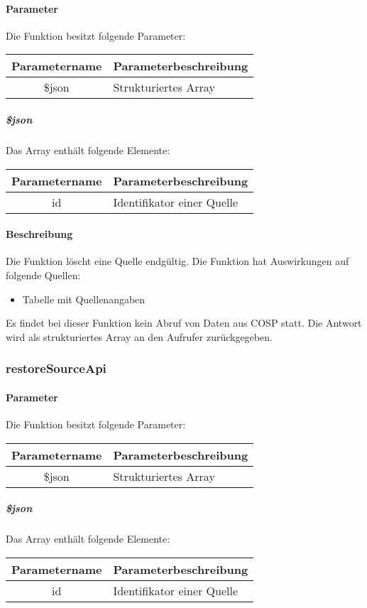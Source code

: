 \paragraph{Parameter} Die Funktion besitzt folgende Parameter:
\begin{table}[H]
	\begin{tabular}{|c|p{11cm}|}
		\hline
		\textbf{Parametername} & \textbf{Parameterbeschreibung} \\ \hline
		\$json & Strukturiertes Array \\ \hline
	\end{tabular}
\end{table}
\subparagraph{\$json}Das Array enthält folgende Elemente:
\begin{table}[H]
	\begin{tabular}{|c|p{11cm}|}
		\hline
		\textbf{Parametername} & \textbf{Parameterbeschreibung} \\ \hline
		id & Identifikator einer Quelle \\ \hline
	\end{tabular}
\end{table}
\paragraph{Beschreibung} Die Funktion löscht eine Quelle endgültig. Die Funktion hat Auswirkungen auf folgende Quellen:
\begin{itemize}
	\item Tabelle mit Quellenangaben
\end{itemize}
Es findet bei dieser Funktion kein Abruf von Daten aus {\glqq COSP\grqq} statt. Die Antwort wird als strukturiertes Array an den Aufrufer zurückgegeben.
\subsubsection{restoreSourceApi}
\paragraph{Parameter} Die Funktion besitzt folgende Parameter:
\begin{table}[H]
	\begin{tabular}{|c|p{11cm}|}
		\hline
		\textbf{Parametername} & \textbf{Parameterbeschreibung} \\ \hline
		\$json & Strukturiertes Array \\ \hline
	\end{tabular}
\end{table}
\subparagraph{\$json}Das Array enthält folgende Elemente:
\begin{table}[H]
	\begin{tabular}{|c|p{11cm}|}
		\hline
		\textbf{Parametername} & \textbf{Parameterbeschreibung} \\ \hline
		id & Identifikator einer Quelle \\ \hline
	\end{tabular}
\end{table}
